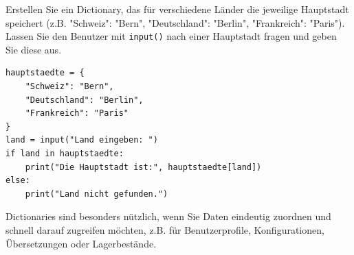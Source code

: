 \begin{myexercise}
    Erstellen Sie ein Dictionary, das für verschiedene Länder die jeweilige Hauptstadt speichert (z.B. "Schweiz": "Bern", "Deutschland": "Berlin", "Frankreich": "Paris"). Lassen Sie den Benutzer mit \lstinline|input()| nach einer Hauptstadt fragen und geben Sie diese aus.

    \begin{myanswer}
        \begin{lstlisting}
hauptstaedte = {
    "Schweiz": "Bern",
    "Deutschland": "Berlin",
    "Frankreich": "Paris"
}
land = input("Land eingeben: ")
if land in hauptstaedte:
    print("Die Hauptstadt ist:", hauptstaedte[land])
else:
    print("Land nicht gefunden.")
\end{lstlisting}
    \end{myanswer}
\end{myexercise}

Dictionaries sind besonders nützlich, wenn Sie Daten eindeutig zuordnen und schnell darauf zugreifen möchten, z.B. für Benutzerprofile, Konfigurationen, Übersetzungen oder Lagerbestände.
